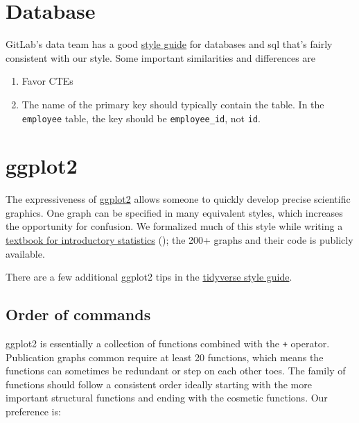 \documentclass[
]{book}
\begin{document}
\hypertarget{style-database}{%
\section{Database}\label{style-database}}

GitLab's data team has a good \href{https://about.gitlab.com/handbook/business-ops/data-team/sql-style-guide/}{style guide} for databases and sql that's fairly consistent with our style. Some important similarities and differences are

\begin{enumerate}
\def\labelenumi{\arabic{enumi}.}
\item
  Favor CTEs
\item
  The name of the primary key should typically contain the table. In the \texttt{employee} table, the key should be \texttt{employee\_id}, not \texttt{id}.
\end{enumerate}

\hypertarget{style-ggplot}{%
\section{ggplot2}\label{style-ggplot}}

The expressiveness of \href{https://ggplot2.tidyverse.org/}{ggplot2} allows someone to quickly develop precise scientific graphics. One graph can be specified in many equivalent styles, which increases the opportunity for confusion. We formalized much of this style while writing a \href{https://github.com/OuhscBbmc/DeSheaToothakerIntroStats/blob/master/thumbnails/thumbnails.md}{textbook for introductory statistics} (\citet{deshea}); the 200+ graphs and their code is publicly available.

There are a few additional ggplot2 tips in the \href{https://style.tidyverse.org/ggplot2.html}{tidyverse style guide}.

\hypertarget{style-ggplot-order}{%
\subsection{Order of commands}\label{style-ggplot-order}}

ggplot2 is essentially a collection of functions combined with the \texttt{+} operator. Publication graphs common require at least 20 functions, which means the functions can sometimes be redundant or step on each other toes. The family of functions should follow a consistent order ideally starting with the more important structural functions and ending with the cosmetic functions. Our preference is:
\end{document}
